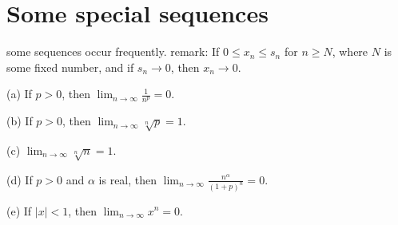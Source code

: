 \section{Some special sequences}

some sequences occur frequently.
remark: If $0\leq x_n \leq s_n$ for $n \geq N$, where $N$ is some fixed number, and if $s_n \rightarrow 0$, then $x_n \rightarrow 0$.

\begin{thm}
    \label{thm:3.20 some sequences occur frequently}
    (a) If $p > 0$, then $\lim_{n \to \infty} \frac{1}{n^p} = 0$. 

    (b) If $p > 0$, then $\lim_{n \to \infty} \sqrt[n]{p} = 1$.
    
    (c) $\lim_{n \to \infty} \sqrt[n]{n} = 1$.
    
    (d) If $p > 0$ and $\alpha$ is real, then $\lim_{n \to \infty} \frac{n^\alpha}{(1+p)^n} = 0$.

    (e) If $|x|<1$, then $\lim_{n \to \infty} x^n = 0$.
\end{thm}